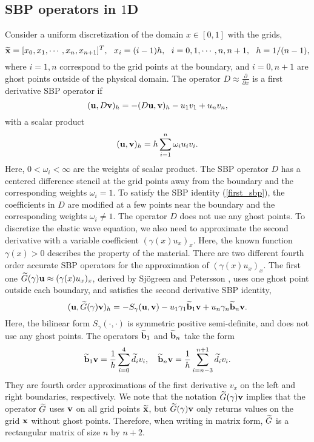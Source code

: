 \subsection{SBP operators in $1$D}\label{sec_sbp_1d}
Consider a uniform discretization of the domain $x\in[0,1]$ with the grids,
\[\widetilde
	{\bf x} = [x_0,x_1,\cdots,x_n,x_{n+1}]^T,\ \  x_i = (i-1)h,\ \ i = 0,1,\cdots,n,n+1,\ \ h = 1/(n-1),\]
where $i = 1,n$ correspond to the grid points at the boundary, and $i = 0,n+1$ are ghost points outside of the physical domain. The  operator $D \approx \frac{\partial }{\partial x}$ is a first derivative SBP operator \cite{Kreiss1974,Strand1994} if 
\begin{equation}\label{first_sbp}
({\bf u}, D{\bf v})_h = -(D{\bf u},{\bf v})_h - u_1v_1 + u_nv_n,
\end{equation}
with a scalar product
\begin{equation}\label{inner_product}
({\bf u},{\bf v})_h = h\sum_{i = 1}^{n}\omega_iu_iv_i.
\end{equation}
Here, $0<\omega_i < \infty $ are the weights of scalar product. The SBP operator $D$ has a centered difference stencil at the grid points away from the boundary and the corresponding weights $\omega_i = 1$. To satisfy the SBP identity (\ref{first_sbp}), the coefficients in $D$ are  modified at a few points near the boundary and the corresponding weights $\omega_i \neq 1$. The operator $D$ does not use any ghost points. To discretize the elastic wave equation, we also need to approximate the second derivative with a variable coefficient $(\gamma(x)u_x)_x$. Here, the known function $\gamma(x)>0$ describes the property of the material. There are two different fourth order accurate SBP operators for the approximation of $(\gamma(x)u_x)_x$. The first one $\widetilde{G}(\gamma){\bf u} \approx (\gamma(x)u_x)_x $, derived by Sj\"ogreen and Petersson \cite{sjogreen2012fourth}, uses one ghost point outside each boundary, and satisfies the second derivative SBP identity,
\begin{equation}\label{sbp_2nd_1}
({\bf u}, \wt{G}(\gamma){\bf v})_h = -S_\gamma({\bf u},{\bf v})-u_1\gamma_1\wt{\bf b}_1{\bf v} + u_n\gamma_n\wt{\bf b}_n {\bf v}.
\end{equation}
Here, the bilinear form $S_\gamma(\cdot,\cdot)$ is symmetric positive semi-definite, and does not use any ghost points. The operators $\widetilde{\bf b}_1$ and $\widetilde{\bf b}_n$ take the form %
\begin{equation}\label{sbp_1st_1}
\wt{\bf b}_1 {\bf v} = \frac{1}{h}\sum_{i=0}^{4} \wt{d}_i v_i, \quad\wt{\bf b}_n {\bf v} = \frac{1}{h}\sum_{i=n-3}^{n+1} \wt{d}_i v_i.
\end{equation}
They are fourth order approximations of the first derivative $v_x$ on the left and right boundaries, respectively. We note that the notation $\widetilde{G}(\gamma){\bf v}$ implies that the operator $\widetilde{G}$ uses ${\bf v}$ on all grid points $\widetilde{\bf x}$, but $\widetilde{G}(\gamma){\bf v}$ only returns values on the grid ${\bf x}$ without ghost points. Therefore, when writing in matrix form, $\widetilde{G}$ is a rectangular matrix of size $n$ by $n+2$.

